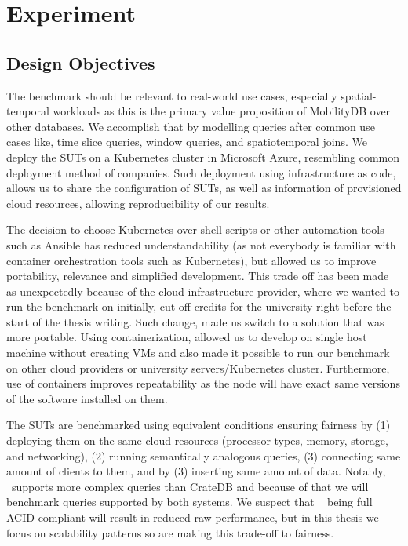 \section{Experiment}
\label{cha:evaluation}

\subsection{Design Objectives}
The benchmark should be relevant to real-world use cases, especially spatial-temporal workloads as this is the primary value proposition of MobilityDB over other databases.
We accomplish that by modelling queries after common use cases like, time slice queries, window queries, and spatiotemporal joins.
We deploy the SUTs on a Kubernetes cluster in Microsoft Azure, resembling common deployment method of companies.
Such deployment using infrastructure as code, allows us to share the configuration of SUTs, as well as information of provisioned cloud resources, allowing reproducibility of our results.

The decision to choose Kubernetes over shell scripts or other automation tools such as Ansible has reduced understandability (as not everybody is familiar with container orchestration tools such as Kubernetes), but allowed us to improve portability, relevance and simplified development.
This trade off has been made as unexpectedly because of the cloud infrastructure provider, where we wanted to run the benchmark on initially, cut off credits for the university right before the start of the thesis writing.
Such change, made us switch to a solution that was more portable.
Using containerization, allowed us to develop on single host machine without creating VMs and also made it possible to run our benchmark on other cloud providers or university servers/Kubernetes cluster.
Furthermore, use of containers improves repeatability as the node will have exact same versions of the software installed on them.

The SUTs are benchmarked using equivalent conditions ensuring fairness by
(1) deploying them on the same cloud resources (processor types, memory, storage, and networking),
(2) running semantically analogous queries,
(3) connecting same amount of clients to them, and by
(3) inserting same amount of data.
Notably, \mobilitydbc~supports more complex queries than CrateDB and because of that we will benchmark queries supported by both systems.
We suspect that \mobilitydbc~ being full ACID compliant will result in reduced raw performance, but in this thesis we focus on scalability patterns so are making this trade-off to fairness.

